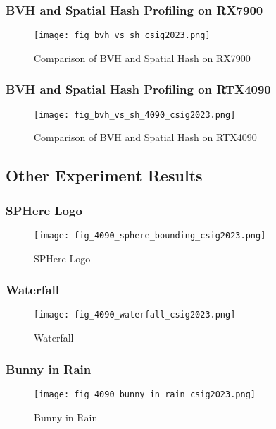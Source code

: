 \begin{frame}
    \frametitle{BVH and Spatial Hash Profiling on RX7900}
    \begin{figure}[H]
        \centering
        \texttt{[image: fig\_bvh\_vs\_sh\_csig2023.png]}
        \caption{Comparison of BVH and Spatial Hash on RX7900}
        \label{fig:bvhvssh}
    \end{figure}
\end{frame}

\begin{frame}
    \frametitle{BVH and Spatial Hash Profiling on RTX4090}
    \begin{figure}[H]
        \centering
        \texttt{[image: fig\_bvh\_vs\_sh\_4090\_csig2023.png]}
        \caption{Comparison of BVH and Spatial Hash on RTX4090}
        \label{fig:bvhvssh}
    \end{figure}
\end{frame}


\subsection{Other Experiment Results}

\begin{frame}
    \frametitle{SPHere Logo}
    \begin{figure}[H]
        \centering
        \texttt{[image: fig\_4090\_sphere\_bounding\_csig2023.png]}
        \caption{SPHere Logo}
    \end{figure}
\end{frame}

\begin{frame}
    \frametitle{Waterfall}
    \begin{figure}[H]
        \centering
        \texttt{[image: fig\_4090\_waterfall\_csig2023.png]}
        \caption{Waterfall}
    \end{figure}
\end{frame}

\begin{frame}
    \frametitle{Bunny in Rain}
    \begin{figure}[H]
        \centering
        \texttt{[image: fig\_4090\_bunny\_in\_rain\_csig2023.png]}
        \caption{Bunny in Rain}
    \end{figure}
\end{frame}